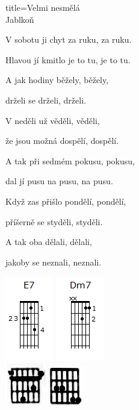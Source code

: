 \begin{song}{title=\centering Velmi nesmělá \\\normalsize Jablkoň  \vspace*{-0.3cm}}
{\begin{minipage}[t]{0.48\textwidth}
\sloka
	V sobotu ji chyt za ruku, za ruku.
	
	Hlavou jí kmitlo je to tu, je to tu.
	
	A jak hodiny běžely, běžely,
	
	drželi se drželi, drželi.

\end{minipage}\begin{minipage}[t]{0.48\textwidth}\setlength{\parindent}{0.45cm}\vspace*{0.55cm}  %

	
\sloka
	V neděli už věděli, věděli,

	že jsou možná dospělí, dospělí.
	
	A tak při sedmém pokusu, pokusu,
	
	dal jí pusu na pusu, na pusu.


\sloka
	Když zas přišlo pondělí, pondělí,
	
	příšerně se styděli, styděli.
	
	A tak oba dělali, dělali,
	
	jakoby se neznali, neznali.



\includegraphics[scale=1.5]{../Akordy/e7.png}
\includegraphics[scale=1.5]{../Akordy/dm7.png}\\
\phantom{dfdfdf}\includegraphics[scale=1.2]{../Akordy/esm7.png}
\phantom{dfdfdf}\includegraphics[scale=1.2]{../Akordy/em72.png}



\end{minipage}
}
\setcounter{Slokočet}{0}
\end{song}


